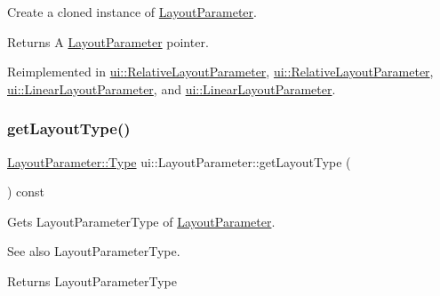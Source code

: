 Create a cloned instance of \hyperlink{classui_1_1LayoutParameter}{Layout\+Parameter}. \begin{DoxyReturn}{Returns}
A \hyperlink{classui_1_1LayoutParameter}{Layout\+Parameter} pointer. 
\end{DoxyReturn}


Reimplemented in \hyperlink{classui_1_1RelativeLayoutParameter_ad3da385d6428bced2722a6308ce685f4}{ui\+::\+Relative\+Layout\+Parameter}, \hyperlink{classui_1_1RelativeLayoutParameter_ac9b09ffad77d413122c56c06c230c4c7}{ui\+::\+Relative\+Layout\+Parameter}, \hyperlink{classui_1_1LinearLayoutParameter_a90adfb888afd28d7ee8974f5a32afe35}{ui\+::\+Linear\+Layout\+Parameter}, and \hyperlink{classui_1_1LinearLayoutParameter_a5f48d9a8e9acb1bea23e15723a3c405a}{ui\+::\+Linear\+Layout\+Parameter}.

\mbox{\label{classui_1_1LayoutParameter_a4dbf300e13a753cd035cc3f45b099400}} 
\subsubsection{\texorpdfstring{get\+Layout\+Type()}{getLayoutType()}\hspace{0.1cm}{\footnotesize\ttfamily [1/2]}}
{\footnotesize\ttfamily \hyperlink{classui_1_1LayoutParameter_a1b01e01e7e6fc3de80f2e6d07fae806e}{Layout\+Parameter\+::\+Type} ui\+::\+Layout\+Parameter\+::get\+Layout\+Type (\begin{DoxyParamCaption}{ }\end{DoxyParamCaption}) const}

Gets Layout\+Parameter\+Type of \hyperlink{classui_1_1LayoutParameter}{Layout\+Parameter}.

\begin{DoxySeeAlso}{See also}
Layout\+Parameter\+Type. 
\end{DoxySeeAlso}
\begin{DoxyReturn}{Returns}
Layout\+Parameter\+Type 
\end{DoxyReturn}
\mbox{\label{classui_1_1LayoutParameter_ae94866a7e51a7fcc9ded78f511c8da96}} 
